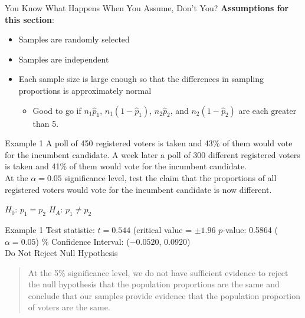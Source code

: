 \documentclass[t]{beamer}
\begin{document}
\begin{frame}{You Know What Happens When You Assume, Don't You?}
\textbf{Assumptions for this section}:
\begin{itemize}
	\item<2-> Samples are randomly selected
	\item<3-> Samples are independent
	\item<4-> Each sample size is large enough so that the differences in sampling proportions is approximately normal
	\begin{itemize}
	\item<5-> Good to go if $n_1\hat{p}_1$, $n_1(1-\hat{p}_1)$, $n_2\hat{p}_2$, and $n_2(1-\hat{p}_2)$ are each greater than 5.
	\end{itemize}
\end{itemize}
\end{frame}

\begin{frame}{Example 1}
A poll of 450 registered voters is taken and 43\% of them would vote for the incumbent candidate. A week later a poll of 300 different registered voters is taken and 41\% of them would vote for the incumbent candidate. \newline\\

At the $\alpha = 0.05$ significance level, test the claim that the proportions of all registered voters would vote for the incumbent candidate is now different.	\newline\\	\pause

$H_0: \, p_1 = p_2$ \newline	\pause
$H_A: \, p_1 \neq p_2$
\end{frame}

\begin{frame}{Example 1}
Test statistic: $t = 0.544$  (critical value = $\pm 1.96$ \newline \pause
$p$-value: 0.5864 ($\alpha = 0.05$) \newline {}\% Confidence Interval: ($-0.0520$, 0.0920)	\newline\\	\pause
Do Not Reject Null Hypothesis	\pause \newline\\
\begin{quote}
At the 5\% significance level, we do not have sufficient evidence to reject the null hypothesis that the population proportions are the same and conclude that our samples provide evidence that the population proportion of voters are the same.
\end{quote}
\end{frame}
\end{document}
